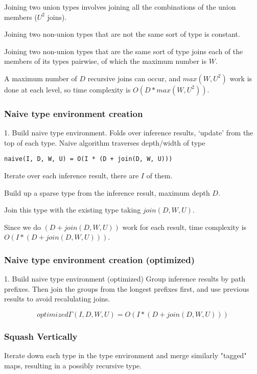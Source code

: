 Joining two union types involves joining all the combinations of the union members ($U^2$ joins).

Joining two non-union types that are not the same sort of type is constant.

Joining two non-union types that are the same sort of type joins
each of the members of its types pairwise, of which the maximum number is $W$.

A maximum number of $D$ recursive joins can occur, and $max(W, U^2)$ work is done
at each level, so time complexity is $O(D * max(W, U^2))$.

\subsubsection{Naive type environment creation}
\label{naive-gamma-slow}

1. Build naive type environment.
   Folds over inference results, `update' from the top of each type.
   Naive algorithm traverses depth/width of type 

\begin{verbatim}
naive(I, D, W, U) = O(I * (D + join(D, W, U)))
\end{verbatim}

Iterate over each inference result, there are $I$ of them.

Build up a sparse type from the inference result, maximum depth $D$.

Join this type with the existing type taking $join(D, W, U)$.

Since we do $(D + join(D, W, U))$ work for each result, time complexity
is $O(I * (D + join(D, W, U)))$.

\subsubsection{Naive type environment creation (optimized)}
\label{naive-gamma-fast}

1. Build naive type environment (optimized)
  Group inference results by path prefixes. Then join the groups
  from the longest prefixes first, and use previous results to avoid
  recalulating joins.

\[
optimized\Gamma(I, D, W, U) = O(I * (D + join(D, W, U)))
\]

\subsubsection{Squash Vertically}
\label{squash-vertically}
Iterate down each type in the type environment and merge similarly "tagged"
maps, resulting in a possibly recursive type.

